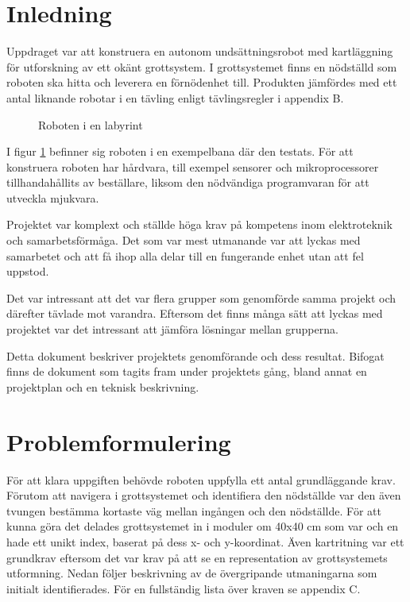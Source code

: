 \documentclass[11pt]{article}
\begin{document}
\begin{flushleft}
\section{Inledning}
Uppdraget var att konstruera en autonom undsättningsrobot med kartläggning för utforskning av ett okänt grottsystem. I grottsystemet finns en nödställd som roboten ska hitta och leverera en förnödenhet till. Produkten jämfördes med ett antal liknande robotar i en tävling enligt tävlingsregler i appendix B.

\begin{figure}[!htbp]
\centering
\noindent\resizebox{.7\linewidth}{!}{
	}
	\caption{Roboten i en labyrint \label{scene}}	
\end{figure}

I figur \ref{scene} befinner sig roboten i en exempelbana där den testats. För att konstruera roboten har hårdvara, till exempel sensorer och mikroprocessorer tillhandahållits av beställare, liksom den nödvändiga programvaran för att utveckla mjukvara.

Projektet var komplext och ställde höga krav på kompetens inom elektroteknik och samarbetsförmåga. Det som var mest utmanande var att lyckas med samarbetet och att få ihop alla delar till en fungerande enhet utan att fel uppstod. 

Det var intressant att det var flera grupper som genomförde samma projekt och därefter tävlade mot varandra. Eftersom det finns många sätt att lyckas med projektet var det intressant att jämföra lösningar mellan grupperna.

Detta dokument beskriver projektets genomförande och dess resultat. Bifogat finns de dokument som tagits fram under projektets gång, bland annat en projektplan och en teknisk beskrivning.

\pagebreak

\section{Problemformulering}
För att klara uppgiften behövde roboten uppfylla ett antal grundläggande krav. Förutom att navigera i grottsystemet och identifiera den nödställde var den även tvungen bestämma kortaste väg mellan ingången och den nödställde. För att kunna göra det delades grottsystemet in i moduler om 40x40 cm som var och en hade ett unikt index, baserat på dess x- och y-koordinat. Även kartritning var ett grundkrav eftersom det var krav på att se en representation av grottsystemets utformning. Nedan följer beskrivning av de övergripande utmaningarna som initialt identifierades. För en fullständig lista över kraven se appendix C.


\end{flushleft}
\end{document}
